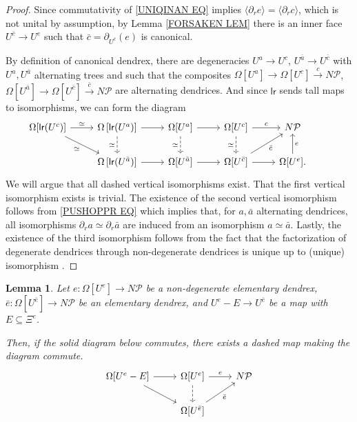 \documentclass[a4paper,10pt
,draft
]{article}%
\numberwithin{equation}{section}
\numberwithin{figure}{section}
\newtheorem{lemma}[equation]{Lemma}%
\theoremstyle{definition} %
\newcommand{\1}{\ensuremath{\mathbbm 1}}%
\begin{document}
\begin{proof}
	Since commutativity of \eqref{UNIQINAN EQ} implies
	$\langle \partial_r e \rangle =
	\langle \partial_r c \rangle$,
	which is not unital by assumption, 
	by Lemma \ref{FORSAKEN LEM} there is an inner face $U^{\bar{c}} \to U^{e}$
	such that $\bar{c} = \partial_{U^{\bar{c}}} (e)$ is canonical.
	
	By definition of canonical dendrex, there are
	degeneracies
	$U^a \to U^c$,
	$U^{\bar{a}} \to U^{\bar{c}}$
	with $U^a,U^{\bar{a}}$
	alternating trees
	and such that the composites 
	$\Omega[U^a] \to \Omega[U^c] \xrightarrow{c} N \mathcal{P}$,
	$\Omega[U^{\bar{a}}] \to \Omega[U^{\bar{c}}] \xrightarrow{\bar{c}} N \mathcal{P}$  
	are alternating dendrices. And since $\mathsf{lr}$ sends tall maps to isomorphisms, we can form the diagram
	\[
	\begin{tikzcd}
	\Omega[\mathsf{lr}(U^c)] \ar{r}{\simeq} \ar{rd}[swap]{\simeq} &
	\Omega\left[\mathsf{lr}(U^a)\right] \ar[dashed]{d}[swap]{\simeq} \ar{r} &
	\Omega[U^a] \ar[dashed]{d}[swap]{\simeq} \ar{r} &
	\Omega[U^c] \ar{r}{c} \ar[dashed]{d}[swap]{\simeq} &
	N \mathcal{P}
	\\
	&
	\Omega\left[\mathsf{lr}(U^{\bar{a}})\right] \ar{r} &
	\Omega[U^{\bar{a}}] \ar{r} &
	\Omega[U^{\bar{c}}] \ar{ru}[swap]{\bar c} \ar{r} &
	\Omega[U^{e}] \ar{u}[swap]{e}. &
	\end{tikzcd}
	\]
	We will argue that all dashed vertical isomorphisms exist.
	That the first vertical isomorphism exists is trivial.
	The existence of the second vertical isomorphism follows from
	\eqref{PUSHOPPR EQ} which implies that, for $a,\bar{a}$ alternating dendrices, all isomorphisms 
	$\partial_r a \simeq \partial_r \bar{a}$
	are induced from an isomorphism $a \simeq \bar{a}$.
	Lastly, the existence of the third isomorphism follows 
	from the fact that the factorization of degenerate dendrices through non-degenerate dendrices is unique up to (unique) isomorphism \cite[Prop. 5.62]{Per18}.
\end{proof}



\begin{lemma}\label{UNIQINAN2 LEM}
	Let 
	$e \colon \Omega[U^e] \to N \mathcal{P}$ 
	be a non-degenerate elementary dendrex,
	$\bar{e} \colon \Omega[U^{\bar{e}}] \to N \mathcal{P}$
	be an elementary dendrex,
	and 
	$U^e-E \to U^{\bar{e}}$ be a map with $E \subseteq \Xi^e$.
	
	Then, 
	if the solid diagram below commutes, there exists a dashed map making the diagram commute.
	\begin{equation}\label{UNIQINAN2 EQ}
	\begin{tikzcd}
	\Omega[U^e-E] \ar{r} \ar{rd}&
	\Omega[U^e] \ar{r}{e} \ar[dashed]{d} &
	N \mathcal{P}
	\\
	&
	\Omega[U^{\bar{e}}] \ar{ru}[swap]{\bar{e}} 
	\end{tikzcd}
	\end{equation}
\end{lemma}
\end{document}
